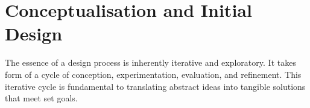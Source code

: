 \synopsisDesign
\mynewline
\section{Conceptualisation and Initial Design}
The essence of a design process is inherently iterative and exploratory. It takes form of a cycle of conception, experimentation, evaluation, and refinement. This iterative cycle is fundamental to translating abstract ideas into tangible solutions that meet set goals.

